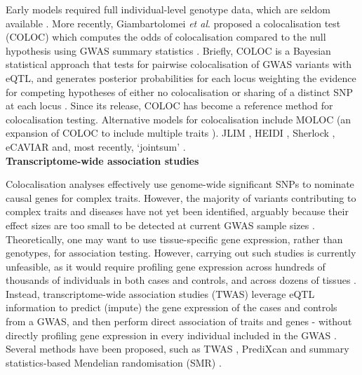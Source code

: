 Early models \cite{plagnol2009statistical, wallace2012statistical, nica2010candidate} required full individual-level genotype data, which are seldom available \cite{cano2020gwas}.
More recently, Giambartolomei \textit{et al}. proposed a  colocalisation test (COLOC) which computes the odds of colocalisation compared to the null hypothesis using GWAS summary statistics \cite{giambartolomei2014bayesian}. 
Briefly, COLOC is a Bayesian statistical approach that tests for pairwise colocalisation of GWAS variants with eQTL, and generates posterior probabilities for each locus weighting the evidence for competing hypotheses of either no colocalisation or sharing of a distinct SNP at each locus \cite{guo2015integration}.
Since its release, COLOC has become a reference method for colocalisation testing. 
Alternative models for colocalisation include 
MOLOC (an expansion of COLOC to include multiple traits \cite{giambartolomei2018bayesian}).
JLIM \cite{chun2017limited}, 
HEIDI \cite{zhu2016integration}, 
Sherlock \cite{he2013sherlock},
eCAVIAR \cite{hormozdiari2016colocalization} 
and, most recently, `jointsum' \cite{deng2020powerful}.\\

\textbf{Transcriptome-wide association studies}

Colocalisation analyses effectively use genome-wide significant SNPs to nominate causal genes for complex traits. 
However, the majority of variants contributing to complex traits and diseases have not yet been identified, arguably because their effect sizes are too small to be detected at current GWAS sample sizes \cite{visscher201710}.
Theoretically, one may want to use tissue-specific gene expression, rather than genotypes, for association testing.
However, carrying out such studies is currently unfeasible, as it would require profiling gene expression across hundreds of thousands of individuals in both cases and controls, and across dozens of tissues \cite{cano2020gwas}.
Instead, transcriptome-wide association studies (TWAS) leverage eQTL information to predict (impute) the gene expression of the cases and controls from a GWAS, and then perform direct association of traits and genes - without directly profiling gene expression in every individual included in the GWAS \cite{wainberg2019opportunities}.
Several methods have been proposed, such as TWAS \cite{gusev2016integrative}, PrediXcan \cite{gamazon2015gene} and summary statistics-based Mendelian randomisation (SMR) \cite{zhu2016integration}. \\

